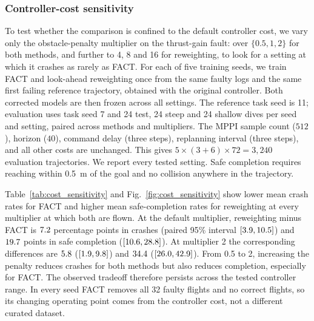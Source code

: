 \documentclass[preprint,12pt]{elsarticle}
\newcommand{\method}{FACT}
\begin{document}
\subsubsection{Controller-cost sensitivity}\label{sec:controller_cost}
To test whether the comparison is confined to the default controller cost, we vary only the obstacle-penalty multiplier on the thrust-gain fault: over $\{0.5,1,2\}$ for both methods, and further to 4, 8 and 16 for reweighting, to look for a setting at which it crashes as rarely as \method{}. For each of five training seeds, we train \method{} and look-ahead reweighting once from the same faulty logs and the same first failing reference trajectory, obtained with the original controller. Both corrected models are then frozen across all settings. The reference task seed is 11; evaluation uses task seed 7 and 24 test, 24 steep and 24 shallow dives per seed and setting, paired across methods and multipliers. The MPPI sample count ($512$), horizon ($40$), command delay (three steps), replanning interval (three steps), and all other costs are unchanged. This gives $5\times(3+6)\times72=3{,}240$ evaluation trajectories. We report every tested setting. Safe completion requires reaching within 0.5~m of the goal and no collision anywhere in the trajectory.



Table~\ref{tab:cost_sensitivity} and Fig.~\ref{fig:cost_sensitivity} show lower mean crash rates for \method{} and higher mean safe-completion rates for reweighting at every multiplier at which both are flown. At the default multiplier, reweighting minus \method{} is $7.2$ percentage points in crashes (paired 95\% interval $[3.9,10.5]$) and $19.7$ points in safe completion ($[10.6,28.8]$). At multiplier 2 the corresponding differences are $5.8$ ($[1.9,9.8]$) and $34.4$ ($[26.0,42.9]$). From 0.5 to 2, increasing the penalty reduces crashes for both methods but also reduces completion, especially for \method{}. The observed tradeoff therefore persists across the tested controller range. In every seed \method{} removes all 32 faulty flights and no correct flights, so its changing operating point comes from the controller cost, not a different curated dataset.
\end{document}
